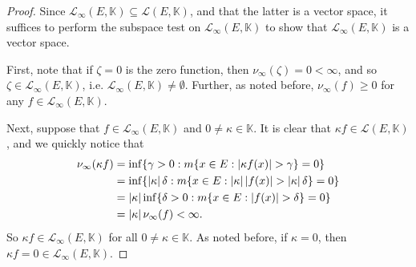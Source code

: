 \documentclass[notoc,notitlepage]{tufte-book}
\begin{document}
\begin{proof}
  Since $\mathcal{L}_\infty(E, \mathbb{K}) \subseteq \mathcal{L}(E,
  \mathbb{K})$, and that the latter is a vector space, it suffices to perform
  the subspace test on $\mathcal{L}_\infty(E, \mathbb{K})$ to show that
  $\mathcal{L}_\infty(E, \mathbb{K})$ is a vector space.

  First, note that if $\zeta = 0$ is the zero function, then $\nu_\infty(\zeta)
  = 0 < \infty$, and so $\zeta \in \mathcal{L}_\infty(E, \mathbb{K})$, i.e.
  $\mathcal{L}_\infty(E, \mathbb{K}) \neq \emptyset$. Further, as noted before,
  $\nu_\infty(f) \geq 0$ for any $f \in \mathcal{L}_\infty(E, \mathbb{K})$.

  Next, suppose that $f \in \mathcal{L}_\infty(E, \mathbb{K})$ and $0 \neq
  \kappa \in \mathbb{K}$.
  It is clear that $\kappa f \in \mathcal{L}(E, \mathbb{K})$,
  and we quickly notice that
  \begin{align*}
    \nu_\infty(\kappa f)
    &= \inf \{ \gamma > 0 : m \{ x \in E : \left|\kappa f(x)\right| > \gamma \} = 0 \}
      \\
    &= \inf \{ \left|\kappa\right| \delta : m \{ x \in E : \left|\kappa\right|\left|f(x)\right| >
      \left|\kappa\right| \delta \} = 0 \} \\
    &= \left|\kappa\right| \inf \{ \delta > 0 : m \{ x \in E : \left|f(x)\right| > \delta \} =
      0 \} \\
    &= \left|\kappa\right| \nu_\infty(f) < \infty.
  \end{align*}
  So $\kappa f \in \mathcal{L}_\infty(E, \mathbb{K})$ for all $0 \neq \kappa \in
  \mathbb{K}$.
  As noted before, if $\kappa = 0$,
  then $\kappa f = 0 \in \mathcal{L}_\infty(E, \mathbb{K})$.


\end{proof}
\end{document}
